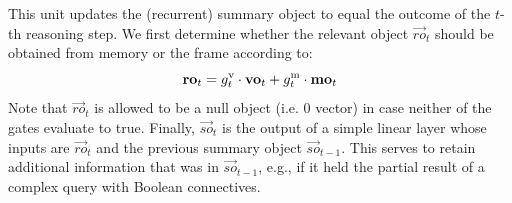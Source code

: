 This unit updates the (recurrent) summary object to equal the outcome of the $t$-th reasoning step.
We first determine whether the relevant object $\vec{ro}_t$ should be obtained from memory or the frame according to:
\[ \mathbf{ro}_t = g^{\mathrm{v}}_t \cdot \mathbf{vo}_t + g^{\mathrm{m}}_t \cdot \mathbf{mo}_t \]
Note that $\vec{ro}_t$ is allowed to be a null object (i.e. 0 vector) in case neither of the gates evaluate to true.
Finally, $\vec{so}_t$ is the output of a simple linear layer whose inputs are $\vec{ro}_t$ and the previous summary object $\vec{so}_{t-1}$.
This serves to retain additional information that was in $\vec{so}_{t-1}$, e.g., if it held the partial result of a complex query with Boolean connectives.

